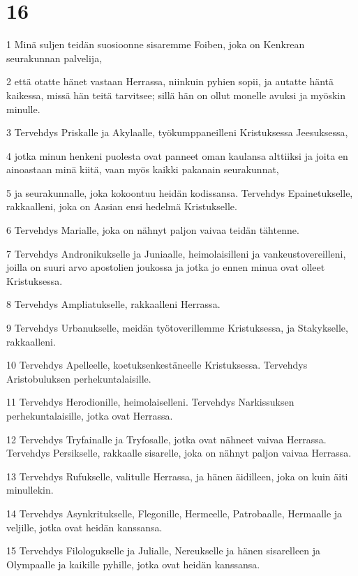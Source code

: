 \chapter{16}

\par 1 Minä suljen teidän suosioonne sisaremme Foiben, joka on Kenkrean seurakunnan palvelija,
\par 2 että otatte hänet vastaan Herrassa, niinkuin pyhien sopii, ja autatte häntä kaikessa, missä hän teitä tarvitsee; sillä hän on ollut monelle avuksi ja myöskin minulle.
\par 3 Tervehdys Priskalle ja Akylaalle, työkumppaneilleni Kristuksessa Jeesuksessa,
\par 4 jotka minun henkeni puolesta ovat panneet oman kaulansa alttiiksi ja joita en ainoastaan minä kiitä, vaan myös kaikki pakanain seurakunnat,
\par 5 ja seurakunnalle, joka kokoontuu heidän kodissansa. Tervehdys Epainetukselle, rakkaalleni, joka on Aasian ensi hedelmä Kristukselle.
\par 6 Tervehdys Marialle, joka on nähnyt paljon vaivaa teidän tähtenne.
\par 7 Tervehdys Andronikukselle ja Juniaalle, heimolaisilleni ja vankeustovereilleni, joilla on suuri arvo apostolien joukossa ja jotka jo ennen minua ovat olleet Kristuksessa.
\par 8 Tervehdys Ampliatukselle, rakkaalleni Herrassa.
\par 9 Tervehdys Urbanukselle, meidän työtoverillemme Kristuksessa, ja Stakykselle, rakkaalleni.
\par 10 Tervehdys Apelleelle, koetuksenkestäneelle Kristuksessa. Tervehdys Aristobuluksen perhekuntalaisille.
\par 11 Tervehdys Herodionille, heimolaiselleni. Tervehdys Narkissuksen perhekuntalaisille, jotka ovat Herrassa.
\par 12 Tervehdys Tryfainalle ja Tryfosalle, jotka ovat nähneet vaivaa Herrassa. Tervehdys Persikselle, rakkaalle sisarelle, joka on nähnyt paljon vaivaa Herrassa.
\par 13 Tervehdys Rufukselle, valitulle Herrassa, ja hänen äidilleen, joka on kuin äiti minullekin.
\par 14 Tervehdys Asynkritukselle, Flegonille, Hermeelle, Patrobaalle, Hermaalle ja veljille, jotka ovat heidän kanssansa.
\par 15 Tervehdys Filologukselle ja Julialle, Nereukselle ja hänen sisarelleen ja Olympaalle ja kaikille pyhille, jotka ovat heidän kanssansa.
